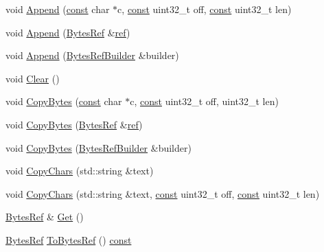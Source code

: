 \begin{DoxyCompactItemize}
\item 
void \mbox{\hyperlink{classlucene_1_1core_1_1util_1_1BytesRefBuilder_a48f1ebac7ad7a3ee8aa359f9428a6b31}{Append}} (\mbox{\hyperlink{ZlibCrc32_8h_a2c212835823e3c54a8ab6d95c652660e}{const}} char $\ast$c, \mbox{\hyperlink{ZlibCrc32_8h_a2c212835823e3c54a8ab6d95c652660e}{const}} uint32\+\_\+t off, \mbox{\hyperlink{ZlibCrc32_8h_a2c212835823e3c54a8ab6d95c652660e}{const}} uint32\+\_\+t len)
\item 
void \mbox{\hyperlink{classlucene_1_1core_1_1util_1_1BytesRefBuilder_a7fef66bf06e6ba21cbd4036febbb4326}{Append}} (\mbox{\hyperlink{classlucene_1_1core_1_1util_1_1BytesRef}{Bytes\+Ref}} \&\mbox{\hyperlink{classlucene_1_1core_1_1util_1_1BytesRefBuilder_ad6f2fc3362182886584f9c3a5fcb9a56}{ref}})
\item 
void \mbox{\hyperlink{classlucene_1_1core_1_1util_1_1BytesRefBuilder_ad3508204608813b8d5cab9a3a9893c21}{Append}} (\mbox{\hyperlink{classlucene_1_1core_1_1util_1_1BytesRefBuilder}{Bytes\+Ref\+Builder}} \&builder)
\item 
void \mbox{\hyperlink{classlucene_1_1core_1_1util_1_1BytesRefBuilder_a32061ccc3f4761a0c210d96bc767506a}{Clear}} ()
\item 
void \mbox{\hyperlink{classlucene_1_1core_1_1util_1_1BytesRefBuilder_aa96983554d3a7042ee52f881aab190a0}{Copy\+Bytes}} (\mbox{\hyperlink{ZlibCrc32_8h_a2c212835823e3c54a8ab6d95c652660e}{const}} char $\ast$c, \mbox{\hyperlink{ZlibCrc32_8h_a2c212835823e3c54a8ab6d95c652660e}{const}} uint32\+\_\+t off, uint32\+\_\+t len)
\item 
void \mbox{\hyperlink{classlucene_1_1core_1_1util_1_1BytesRefBuilder_ad03ce9a53e3dbd380fc9b34dcfa3de51}{Copy\+Bytes}} (\mbox{\hyperlink{classlucene_1_1core_1_1util_1_1BytesRef}{Bytes\+Ref}} \&\mbox{\hyperlink{classlucene_1_1core_1_1util_1_1BytesRefBuilder_ad6f2fc3362182886584f9c3a5fcb9a56}{ref}})
\item 
void \mbox{\hyperlink{classlucene_1_1core_1_1util_1_1BytesRefBuilder_a3fccb29fdf28aad9a850b17228f2b71a}{Copy\+Bytes}} (\mbox{\hyperlink{classlucene_1_1core_1_1util_1_1BytesRefBuilder}{Bytes\+Ref\+Builder}} \&builder)
\item 
void \mbox{\hyperlink{classlucene_1_1core_1_1util_1_1BytesRefBuilder_a93e4b7444976f335d0b78c59cfb1c369}{Copy\+Chars}} (std\+::string \&text)
\item 
void \mbox{\hyperlink{classlucene_1_1core_1_1util_1_1BytesRefBuilder_aecfe5fb3b1ce86ec5c6358b3e1d06e4c}{Copy\+Chars}} (std\+::string \&text, \mbox{\hyperlink{ZlibCrc32_8h_a2c212835823e3c54a8ab6d95c652660e}{const}} uint32\+\_\+t off, \mbox{\hyperlink{ZlibCrc32_8h_a2c212835823e3c54a8ab6d95c652660e}{const}} uint32\+\_\+t len)
\item 
\mbox{\hyperlink{classlucene_1_1core_1_1util_1_1BytesRef}{Bytes\+Ref}} \& \mbox{\hyperlink{classlucene_1_1core_1_1util_1_1BytesRefBuilder_aa2ba757baac66b6dd039452f7384608e}{Get}} ()
\item 
\mbox{\hyperlink{classlucene_1_1core_1_1util_1_1BytesRef}{Bytes\+Ref}} \mbox{\hyperlink{classlucene_1_1core_1_1util_1_1BytesRefBuilder_ae481f6bccf50d56bf37a5a726c89f6ca}{To\+Bytes\+Ref}} () \mbox{\hyperlink{ZlibCrc32_8h_a2c212835823e3c54a8ab6d95c652660e}{const}}
\end{DoxyCompactItemize}
